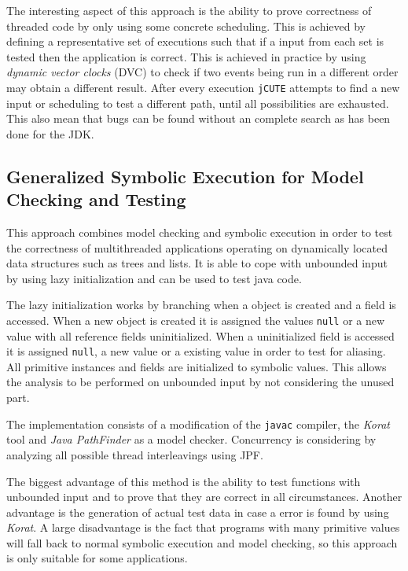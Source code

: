 \documentclass[10pt]{llncs}
\begin{document}
The interesting aspect of this approach is the ability to prove correctness of threaded code by only using some concrete scheduling. This is achieved by  defining a representative set of executions such that if a input from each set is tested then the application is correct. This is achieved in practice by using \emph{dynamic vector clocks} (DVC) \cite{dvc} to check if two events being run in a different order may obtain a different result. After every execution \texttt{jCUTE} attempts to find a new input or scheduling to test a different path, until all possibilities are exhausted. This also mean that bugs can be found without an complete search as has been done for the JDK.

\subsection{Generalized Symbolic Execution for Model Checking and Testing \cite{base5}}

This approach combines model checking and symbolic execution in order to test the correctness of multithreaded applications operating on dynamically located data structures such as trees and lists. It is able to cope with unbounded input by using lazy initialization and can be used to test java code.

The lazy initialization works by branching when a object is created and a field is accessed. When a new object is created it is assigned the values \texttt{null} or a new value with all reference fields uninitialized. When a uninitialized field is accessed it is assigned \texttt{null}, a new value or a existing value in order to test for aliasing. All primitive instances and fields are initialized to symbolic values. This allows the analysis to be performed on unbounded input by not considering the unused part.

The implementation consists of a modification of the \texttt{javac} compiler, the \emph{Korat} tool \cite{korat} and \emph{Java PathFinder} \cite{pathfinder} as a model checker. Concurrency is considering by analyzing all possible thread interleavings using JPF.

The biggest advantage of this method is the ability to test functions with unbounded input and to prove that they are correct in all circumstances. Another advantage is the generation of actual test data in case a error is found by using \emph{Korat}. A large disadvantage is the fact that programs with many primitive values will fall back to normal symbolic execution and model checking, so this approach is only suitable for some applications.
\end{document}

